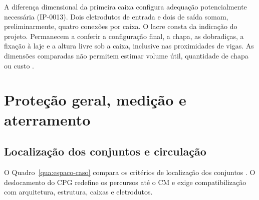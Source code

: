 \par\noindent
\begin{minipage}{\linewidth}
  \label{fig:comparacao-caixas-metalicas}
  \vspace{0.7\baselineskip}
  {\centering
  \par}
\end{minipage}
\par

A diferença dimensional da primeira caixa configura adequação potencialmente necessária (IP-0013). Dois eletrodutos de entrada e dois de saída somam, preliminarmente, quatro conexões por caixa. O lacre consta da indicação do projeto. Permanecem a conferir a configuração final, a chapa, as dobradiças, a fixação à laje e a altura livre sob a caixa, inclusive nas proximidades de vigas. As dimensões comparadas não permitem estimar volume útil, quantidade de chapa ou custo \cite[prancha~002]{palatiumpranchas2025}\cite[item~7.19.1]{enel1580}.

\section{Proteção geral, medição e aterramento}

\subsection{Localização dos conjuntos e circulação}\label{subsec:impacto-cpg-cm}

O Quadro~\ref{qua:espaco-caso} compara os critérios de localização dos conjuntos \cite[itens~7.7.5 e~7.7.8.1.1]{enel0126}\cite[itens~7.18.1--7.18.3 e~7.22.6]{enel1580}. O deslocamento do CPG redefine os percursos até o CM e exige compatibilização com arquitetura, estrutura, caixas e eletrodutos.

